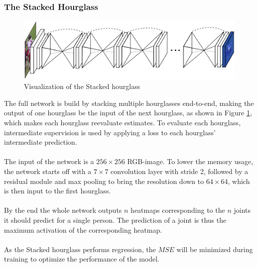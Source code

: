\documentclass[./main.tex]{subfiles}
\begin{document}
\subsubsection{The Stacked Hourglass}
\begin{figure}[htbp]
    \centering
    \includegraphics[height = 4 cm]{entities/SHG.png}
    \caption{Visualization of the Stacked hourglass \cite{Newell}}
    \label{fig:SHG}
\end{figure}
\noindent The full network is build by stacking multiple hourglasses end-to-end, making the output of one hourglass be the input of the next hourglass, as shown in Figure \ref{fig:SHG}, which makes each hourglass reevaluate estimates. To evaluate each hourglass, intermediate supervision is used by applying a loss to each hourglass' intermediate prediction.
\\
\\
The input of the network is a $256 \times 256$ RGB-image. To lower the memory usage, the network starts off with a $7 \times 7$ convolution layer with stride 2, followed by a residual module and max pooling to bring the resolution down to $64 \times 64$, which is then input to the first hourglass.
\\
\\
By the end the whole network outputs $n$ heatmaps corresponding to the $n$ joints it should predict for a single person. The prediction of a joint is thus the maximum activation of the corresponding heatmap.
\\
\\
As the Stacked hourglass performs regression, the $MSE$ will be minimized during training to optimize the performance of the model.
\end{document}
